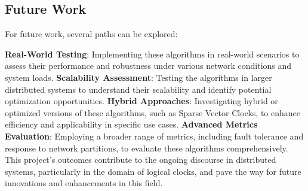 \documentclass{article}
\begin{document}
  \subsection{Future Work}
  For future work, several paths can be explored:

  \textbf{Real-World Testing}: Implementing these algorithms in real-world scenarios to assess their performance and robustness under various network conditions and system loads.
  \textbf{Scalability Assessment}: Testing the algorithms in larger distributed systems to understand their scalability and identify potential optimization opportunities.
  \textbf{Hybrid Approaches}: Investigating hybrid or optimized versions of these algorithms, such as Sparse Vector Clocks, to enhance efficiency and applicability in specific use cases.
  \textbf{Advanced Metrics Evaluation}: Employing a broader range of metrics, including fault tolerance and response to network partitions, to evaluate these algorithms comprehensively.
  This project's outcomes contribute to the ongoing discourse in distributed systems, particularly in the domain of logical clocks, and pave the way for future innovations and enhancements in this field.

    
    \nocite{*}
\end{document}

